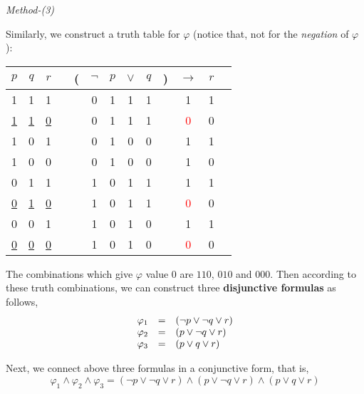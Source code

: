 \documentclass[UTF8,12pt,a4paper]{ctexart}
\begin{document}
\vspace{1em}

\noindent\textit{Method-(3)}

Similarly, we construct a truth table for $\varphi$ (notice that, not for the \textit{negation} of $\varphi$):

\begin{center}
	\begin{tabular}{@{ }c@{ }@{ }c@{ }@{ }c | c@{ }@{}c@{}@{ }c@{ }@{ }c@{ }@{ }c@{ }@{ }c@{ }@{}c@{}@{ }c@{ }@{ }c@{ }@{ }c}
		$p$ & $q$ & $r$ &  & ( & $\lnot$ & $p$ & $\lor$ & $q$ & ) & $\rightarrow$ & $r$ & \\
		\hline 
		1 & 1 & 1 &  &  & 0 & 1 & 1 & 1 &  &                  1 & 1 & \\
		\underline{1} & \underline{1} & \underline{0} &  &  & 0 & 1 & 1 & 1 &  & \textcolor{red}{0} & 0 & \\
		1 & 0 & 1 &  &  & 0 & 1 & 0 & 0 &  &                 1  & 1 & \\
		1 & 0 & 0 &  &  & 0 & 1 & 0 & 0 &  & 				 1 & 0 & \\
		0 & 1 & 1 &  &  & 1 & 0 & 1 & 1 &  & 				 1 & 1 & \\
		\underline{0} & \underline{1} & \underline{0} &  &  & 1 & 0 & 1 & 1 &  & \textcolor{red}{0} & 0 & \\
		0 & 0 & 1 &  &  & 1 & 0 & 1 & 0 &  & 				 1 & 1 & \\
		\underline{0} & \underline{0} & \underline{0} &  &  & 1 & 0 & 1 & 0 &  & \textcolor{red}{0} & 0 & \\
	\end{tabular}
\end{center}

The combinations which give $\varphi$ value $0$ are $110$, $010$ and $000$. 
Then according to these truth combinations, we can construct three \textbf{disjunctive formulas} as follows,
\[\begin{array}{l l l}
	\varphi_1 
	&=&
	(\neg p \lor \neg q \lor r) \\ 
	
	\varphi_2
	&=&
	( p \lor \neg q \lor r) \\
	
	\varphi_3
	&=&
	( p \lor  q \lor r)  \\
\end{array}\]

Next, we connect above three formulas in a conjunctive form, that is,
\[
\varphi_1 \land \varphi_2 \land \varphi_3 = ( \neg p \lor \neg q \lor  r) \land  ( p \lor \neg q \lor r) \land  ( p \lor  q \lor r)
\]
\end{document}
